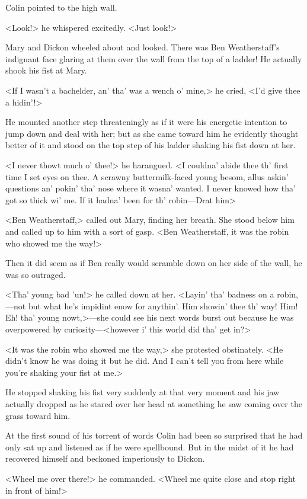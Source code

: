 Colin pointed to the high wall.

<Look!> he whispered excitedly. <Just look!>

Mary and Dickon wheeled about and looked. There was Ben Weatherstaff's indignant face glaring at them over the wall from the top of a ladder! He actually shook his fist at Mary.

<If I wasn't a bachelder, an' tha' was a wench o' mine,> he cried, <I'd give thee a hidin'!>

He mounted another step threateningly as if it were his energetic intention to jump down and deal with her; but as she came toward him he evidently thought better of it and stood on the top step of his ladder shaking his fist down at her.

<I never thowt much o' thee!> he harangued. <I couldna' abide thee th' first time I set eyes on thee. A scrawny buttermilk-faced young besom, allus askin' questions an' pokin' tha' nose where it wasna' wanted. I never knowed how tha' got so thick wi' me. If it hadna' been for th' robin—Drat him\longdash>

<Ben Weatherstaff,> called out Mary, finding her breath. She stood below him and called up to him with a sort of gasp. <Ben Weatherstaff, it was the robin who showed me the way!>

Then it did seem as if Ben really would scramble down on her side of the wall, he was so outraged.

<Tha' young bad 'un!> he called down at her. <Layin' tha' badness on a robin,—not but what he's impidint enow for anythin'. Him showin' thee th' way! Him! Eh! tha' young nowt,>—she could see his next words burst out because he was overpowered by curiosity—<however i' this world did tha' get in?>

<It was the robin who showed me the way,> she protested obstinately. <He didn't know he was doing it but he did. And I can't tell you from here while you're shaking your fist at me.>

He stopped shaking his fist very suddenly at that very moment and his jaw actually dropped as he stared over her head at something he saw coming over the grass toward him.

At the first sound of his torrent of words Colin had been so surprised that he had only sat up and listened as if he were spellbound. But in the midst of it he had recovered himself and beckoned imperiously to Dickon.

<Wheel me over there!> he commanded. <Wheel me quite close and stop right in front of him!>

